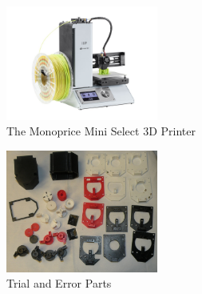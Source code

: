 \documentclass[12pt, twocolumn]{article}
\begin{document}
\begin{figure}
  \centering
  \includegraphics[width=5cm]{MiniSelect3DPrinter.jpg}
  \caption{The Monoprice Mini Select 3D Printer}

  \label{f_printer}
\end{figure}

\begin{figure}
  \centering
  \includegraphics[width=5cm]{TrialAndError1.jpg}
  \caption{Trial and Error Parts}
  \label{f_trial_and_error}
\end{figure}
\end{document}
